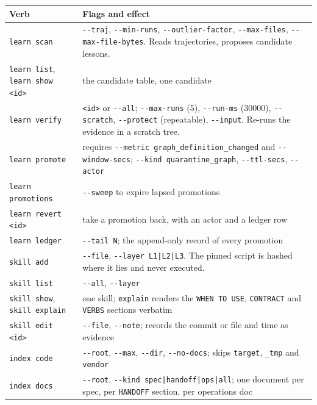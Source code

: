 \begin{center}
\begin{tabular}{@{}>{\raggedright\arraybackslash}p{}>{\raggedright\arraybackslash}p{}@{}}
  \toprule
  \textbf{Verb} & \textbf{Flags and effect} \\
  \midrule
  \texttt{learn scan} & \texttt{-{}-traj}, \texttt{-{}-min-runs}, \texttt{-{}-outlier-factor},
    \texttt{-{}-max-files}, \texttt{-{}-max-file-bytes}. Reads trajectories, proposes
    candidate lessons. \\
  \texttt{learn list}, \texttt{learn show <id>} & the candidate table, one candidate \\
  \texttt{learn verify} & \texttt{<id>} or \texttt{-{}-all}; \texttt{-{}-max-runs} (5),
    \texttt{-{}-run-ms} (30000), \texttt{-{}-scratch}, \texttt{-{}-protect} (repeatable),
    \texttt{-{}-input}. Re-runs the evidence in a scratch tree. \\
  \texttt{learn promote} & requires \texttt{-{}-metric graph\_definition\_changed} and
    \texttt{-{}-window-secs}; \texttt{-{}-kind quarantine\_graph}, \texttt{-{}-ttl-secs},
    \texttt{-{}-actor} \\
  \texttt{learn promotions} & \texttt{-{}-sweep} to expire lapsed promotions \\
  \texttt{learn revert <id>} & take a promotion back, with an actor and a ledger row \\
  \texttt{learn ledger} & \texttt{-{}-tail N}; the append-only record of every promotion \\
  \texttt{skill add} & \texttt{-{}-file}, \texttt{-{}-layer L1|L2|L3}. The pinned script is
    hashed where it lies and never executed. \\
  \texttt{skill list} & \texttt{-{}-all}, \texttt{-{}-layer} \\
  \texttt{skill show}, \texttt{skill explain} & one skill; \texttt{explain} renders the
    \texttt{WHEN TO USE}, \texttt{CONTRACT} and \texttt{VERBS} sections verbatim \\
  \texttt{skill edit <id>} & \texttt{-{}-file}, \texttt{-{}-note}; records the commit or file
    and time as evidence \\
  \texttt{index code} & \texttt{-{}-root}, \texttt{-{}-max}, \texttt{-{}-dir},
    \texttt{-{}-no-docs}; skips \texttt{target}, \texttt{\_tmp} and \texttt{vendor} \\
  \texttt{index docs} & \texttt{-{}-root}, \texttt{-{}-kind spec|handoff|ops|all}; one
    document per spec, per \texttt{HANDOFF} section, per operations doc \\
  \bottomrule
\end{tabular}
\end{center}

